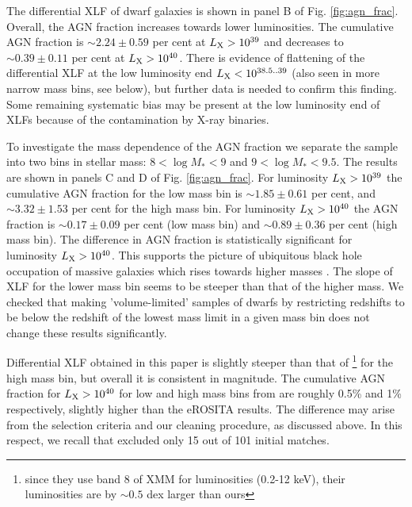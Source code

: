 \documentclass[fleqn,usenatbib]{mnras}
\begin{document}
The differential XLF of dwarf galaxies is shown in panel B of Fig. \ref{fig:agn_frac}. Overall, the AGN fraction increases towards lower luminosities. The cumulative AGN fraction is $\sim2.24\pm0.59$ per cent at $L_{\rm X}>10^{39}$ and decreases to $\sim0.39\pm0.11$ per cent at $L_{\rm X}>10^{40}$.  There is evidence of flattening of the differential XLF  at the low luminosity end $L_{\rm X}<10^{38.5..39}$ (also seen in more narrow  mass bins, see below), but further data is needed to confirm  this finding. Some remaining systematic bias may be present at the low luminosity end of XLFs  because of the contamination by X-ray binaries.



To investigate the mass dependence of the   AGN fraction we separate the sample into two bins in stellar mass: $8<\log{M_*}<9$ and $9<\log{M_*}<9.5$. The results are shown in panels C and D of Fig. \ref{fig:agn_frac}. For luminosity $L_{\rm X}>10^{39}$ the cumulative AGN fraction for the low mass bin is $\sim1.85\pm0.61$ per cent, and $\sim3.32\pm1.53$ per cent for the high mass bin. For luminosity $L_{\rm X}>10^{40}$ the AGN fraction is $\sim0.17\pm0.09$ per cent (low mass bin) and $\sim0.89\pm0.36$ per cent (high mass bin). The difference in AGN fraction is statistically significant  for luminosity $L_{\rm X}>10^{40}$. This supports the picture of ubiquitous black hole occupation of massive galaxies which rises towards higher masses \citep{Aird2012,Aird2018}. The slope of XLF for the lower mass bin seems to be steeper than that of the higher mass.  We checked that making 'volume-limited' samples of dwarfs by restricting redshifts to be below the redshift of the lowest mass limit in a given mass bin does not change these results significantly. 

Differential XLF obtained in this paper is slightly steeper than that of \citealt{Birchall2020}\footnote{since they use band 8 of XMM for luminosities (0.2-12 keV), their luminosities are by $\sim0.5$ dex larger than ours} for the high mass bin, but overall it is consistent in magnitude. The cumulative AGN fraction for $L_{\rm X}>10^{40}$ for low and high mass bins from \citealt{Birchall2020} are roughly 0.5\% and 1\% respectively, slightly higher than the eROSITA results. The difference may arise from the selection criteria and our cleaning procedure, as discussed above. In this respect, we recall  that  \citeauthor{Birchall2020} excluded only 15 out of 101 initial matches. 
\end{document}
